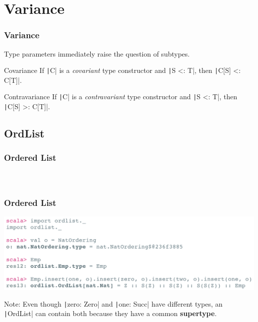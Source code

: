 \documentclass[10pt, usenames, dvipsnames, table]{beamer}
\begin{document}
\section{Variance}
\begin{frame}
  \frametitle{Variance}
  Type parameters immediately raise the question of subtypes.

  \pause{}
  \begin{block}{Covariance}
    If \texttt|C| is a \emph{covariant} type constructor and
    \texttt|S <: T|, then \texttt|C[S] <: C[T]|.
  \end{block}
  \pause{}
  \begin{block}{Contravariance}
    If \texttt|C| is a \emph{contravariant} type constructor and
    \texttt|S <: T|, then \texttt|C[S] >: C[T]|.
  \end{block}
\end{frame}

\subsection{OrdList}
\begin{frame}
  \frametitle{Ordered List}
  \inputminted[firstline=1, lastline=8, fontsize=\scriptsize]
  {Scala}{../examples/OrdList.scala}
  \pause{}
  \inputminted[firstline=9, lastline=15, fontsize=\scriptsize]
  {Scala}{../examples/OrdList.scala}
  \pause{}
  \inputminted[firstline=16, fontsize=\scriptsize]
  {Scala}{../examples/OrdList.scala}
\end{frame}

\begin{frame}
  \frametitle{Ordered List}
  \includegraphics[width=\linewidth]{ordlist_usage}
  \vspace{1em}
  \pause{}
  \begin{block}{Note:}
    Even though \texttt|zero: Zero| and \texttt|one: Succ|
    have different types, an \texttt|OrdList| can contain both
    because they have a common \textbf{supertype}.
  \end{block}
\end{frame}
\end{document}
